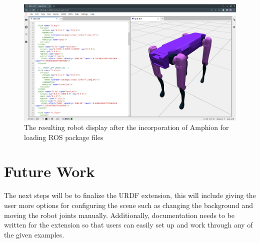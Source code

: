     \begin{figure}[H]
        \centering
        \includegraphics[width=\linewidth]{Images/12_urdfSpot.png}
        \caption{The resulting robot display after the incorporation of Amphion for loading ROS package files}
        \label{fig:urdfSpot}
    \end{figure}

    \section{Future Work}
    
    The next steps will be to finalize the URDF extension, this will include giving the user more options for configuring the scene such as changing the background and moving the robot joints manually. Additionally, documentation needs to be written for the extension so that users can easily set up and work through any of the given examples.
